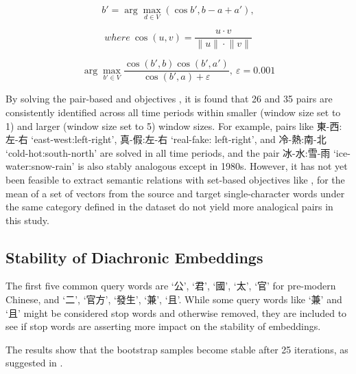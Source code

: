 \begin{equation}
  b' = \arg\max_{d \in V}(\cos b', b - a + a'){,}
\end{equation}

\begin{equation*}
  where\: \cos(u,v) = \frac{u \cdot v}{\lVert{u}\rVert \cdot \lVert{v}\rVert}
\end{equation*}

\begin{equation}
  \arg\max_{b' \in V}\frac{\cos(b',b) \cos(b',a')}{\cos(b',a) + \varepsilon}{,}\: \varepsilon = 0.001
\end{equation}

By solving the pair-based  and  objectives \parencite{levy2014linguistic}, it is found that 26 and 35 pairs are consistently identified across all time periods within smaller (window size set to 1) and larger (window size set to 5) window sizes. For example, pairs like 東-西:左-右 `east-west:left-right', 真-假:左-右 `real-fake: left-right', and 冷-熱:南-北 `cold-hot:south-north' are solved in all time periods, and the pair 冰-水:雪-雨 `ice-water:snow-rain' is also stably analogous except in 1980s. However, it has not yet been feasible to extract semantic relations with set-based objectives like , for the mean of a set of vectors from the source and target single-character words under the same category defined in the dataset do not yield more analogical pairs in this study. %

\subsection{Stability of  Diachronic Embeddings}

The first five common query words are `公', `君', `國', `太', `官' for pre-modern Chinese, and `二', `官方', `發生', `兼', `且'. While some query words like `兼' and `且' might be considered stop words and otherwise removed, they are included to see if stop words are asserting more impact on the stability of  embeddings.

The results show that the bootstrap samples become stable after 25 iterations, as suggested in \textcite{antoniak2018evaluating}. 


